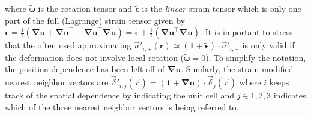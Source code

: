 where $\tilde{\bm{\omega}}$ is the rotation tensor and $\tilde{\bm{\epsilon}}$ is the \emph{linear} strain tensor which is only one part of the full (Lagrange) strain tensor given by $\bm{\epsilon} = \tfrac{1}{2}(\bm{\nabla u} + \bm{\nabla u}^\top+\bm{\nabla u}^\top\bm{\nabla u}) = \tilde{\bm{\epsilon}} + \tfrac{1}{2}(\bm{\nabla u}^\top\bm{\nabla u})$.
It is important to stress that the often used approximating $\vec{a}'_{i,\pm}(\bm{r})\simeq (\bm{1}+\tilde{\bm{\epsilon}})\cdot \vec{a}'_{i,\pm}$ is only valid if the deformation does not involve local rotation ($\tilde{\bm{\omega}}=0$).
To simplify the notation, the position dependence has been left off of $\bm{\nabla u}$.
Similarly, the strain modified nearest neighbor vectors are $\vec{\delta}'_{i,j}(\vec{r})=(\bm{1}+\bm{\nabla u}) \cdot \vec{\delta}_{j}(\vec{r})$ \cite{Kitt2013} where $i$ keeps track of the spatial dependence by indicating the unit cell and $j \in {1,2,3}$ indicates which of the three nearest neighbor vectors is being referred to.

